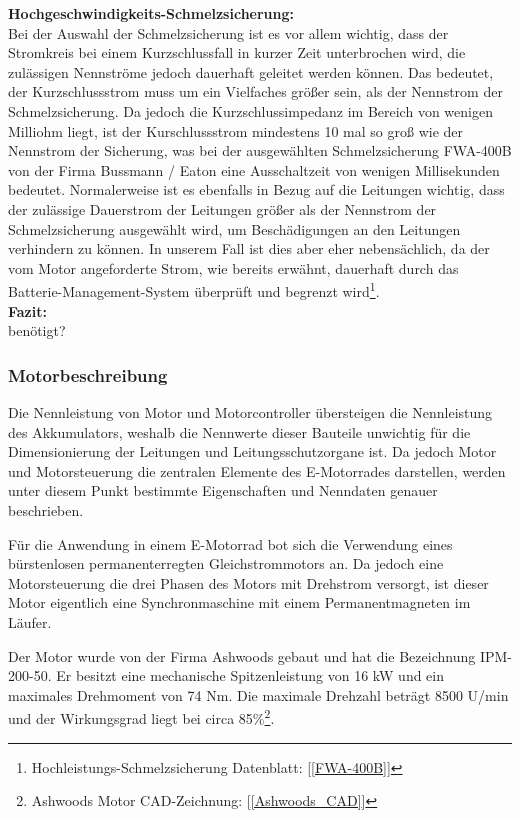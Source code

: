 \textbf{Hochgeschwindigkeits-Schmelzsicherung:}
 \\[2mm]
Bei der Auswahl der Schmelzsicherung ist es vor allem wichtig, dass der Stromkreis bei einem Kurzschlussfall in kurzer Zeit unterbrochen wird, die zulässigen Nennströme jedoch dauerhaft geleitet werden können. Das bedeutet, der Kurzschlussstrom muss um ein Vielfaches größer sein, als der Nennstrom der Schmelzsicherung. Da jedoch die Kurzschlussimpedanz im Bereich von wenigen Milliohm liegt, ist der Kurschlussstrom mindestens 10 mal so groß wie der Nennstrom der Sicherung, was bei der ausgewählten Schmelzsicherung \glqq FWA-400B\grqq{} von der Firma \glqq Bussmann / Eaton\grqq{} eine Ausschaltzeit von wenigen Millisekunden bedeutet. Normalerweise ist es ebenfalls in Bezug auf die Leitungen wichtig, dass der zulässige Dauerstrom der Leitungen größer als der Nennstrom der Schmelzsicherung ausgewählt wird, um Beschädigungen an den Leitungen verhindern zu können. In unserem Fall ist dies aber eher nebensächlich, da der vom Motor angeforderte Strom, wie bereits erwähnt, dauerhaft durch das Batterie-Management-System überprüft und begrenzt wird\footnote{Hochleistungs-Schmelzsicherung Datenblatt: [\ref{FWA-400B}]}.
\\[5mm]

\textbf{Fazit:}
\\[2mm]
benötigt?

\newpage

\subsubsection{Motorbeschreibung}
Die Nennleistung von Motor und Motorcontroller übersteigen die Nennleistung des Akkumulators, weshalb die Nennwerte dieser Bauteile unwichtig für die Dimensionierung der Leitungen und Leitungsschutzorgane ist. Da jedoch Motor und Motorsteuerung die zentralen Elemente des E-Motorrades darstellen, werden unter diesem Punkt bestimmte Eigenschaften und Nenndaten genauer beschrieben.

Für die Anwendung in einem E-Motorrad bot sich die Verwendung eines bürstenlosen  permanenterregten Gleichstrommotors an. Da jedoch eine Motorsteuerung die drei Phasen des Motors mit Drehstrom versorgt, ist dieser Motor eigentlich eine Synchronmaschine mit einem Permanentmagneten im Läufer. 

Der Motor wurde von der Firma Ashwoods gebaut und hat die Bezeichnung \glqq IPM-200-50\grqq{}. Er besitzt eine mechanische Spitzenleistung von 16 kW und ein maximales Drehmoment von 74 Nm. Die maximale Drehzahl beträgt 8500 U/min und der Wirkungsgrad liegt bei circa 85\%\footnote{Ashwoods Motor CAD-Zeichnung: [\ref{Ashwoods_CAD}]}.


